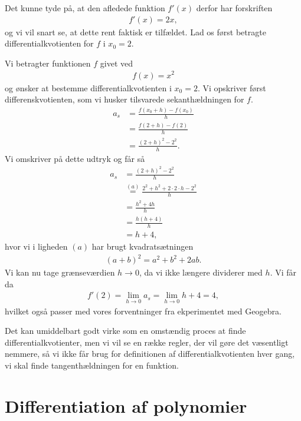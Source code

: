Det kunne tyde på, at den afledede funktion $f'(x)$ derfor har forskriften 
\begin{align*}
	f'(x) = 2x,
\end{align*}
og vi vil snart se, at dette rent faktisk er tilfældet. Lad os først betragte differentialkvotienten for $f$ i $x_0 = 2$.
\begin{exa}
	\label{exa:diffkvo}
	Vi betragter funktionen $f$ givet ved
	\begin{align*}
		f(x) = x^2
	\end{align*}
	og ønsker at bestemme differentialkvotienten i $x_0 = 2$. Vi opskriver først differenskvotienten, som vi
	husker tilsvarede sekanthældningen for $f$. 
	\begin{align*}
		a_s &= \frac{f(x_0 + h)-f(x_0)}{h}\\
		&= \frac{f(2 + h)-f(2)}{h}\\
		&= \frac{(2+h)^2 - 2^2}{h}.
	\end{align*}
	Vi omskriver på dette udtryk og får så
	\begin{align*}
		a_s &= \frac{(2+h)^2 - 2^2}{h} \\
		&\stackrel{(a)}{=} \frac{2^2 + h^2 + 2\cdot 2\cdot h - 2^2}{h} \\
		&= \frac{h^2+4h}{h} \\
		&= \frac{h(h+4)}{h} \\
		&= h + 4,
	\end{align*}
	hvor vi i ligheden $(a)$ har brugt kvadratsætningen 
	\begin{align*}
		(a+b)^2 = a^2 + b^2 +2ab.
	\end{align*}
	Vi kan nu tage grænseværdien $h \to 0$, da vi ikke længere dividerer med $h$. Vi får da
	\begin{align*}
		f'(2) = \lim_{h \to 0}a_s = \lim_{h \to 0} h + 4 = 4,
	\end{align*}
	hvilket også passer med vores forventninger fra ekperimentet med Geogebra. 
\end{exa}

Det kan umiddelbart godt virke som en omstændig proces at finde differentialkvotienter, men vi vil se en række regler, der vil gøre det væsentligt nemmere, så vi ikke får brug for definitionen af differentialkvotienten hver gang, vi skal finde tangenthældningen for en funktion. 
\section*{Differentiation af polynomier}

